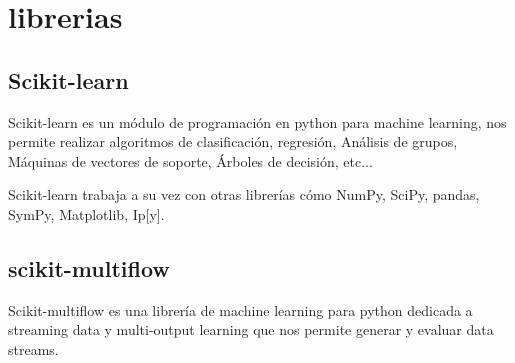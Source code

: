 \section{librerias}

\subsection{Scikit-learn}

Scikit-learn es un módulo de programación en python para machine learning, nos permite realizar algoritmos de clasificación, regresión, Análisis de grupos, Máquinas de vectores de soporte, Árboles de decisión, etc...

Scikit-learn trabaja a su vez con otras librerías cómo NumPy, SciPy, pandas, SymPy, Matplotlib, Ip[y].\cite{pagina:scikit-learn}

\subsection{scikit-multiflow}

Scikit-multiflow es una librería de machine learning para python dedicada a streaming data y multi-output learning que nos permite generar y evaluar data streams.\cite{pagina:scikit-mutliflow}
